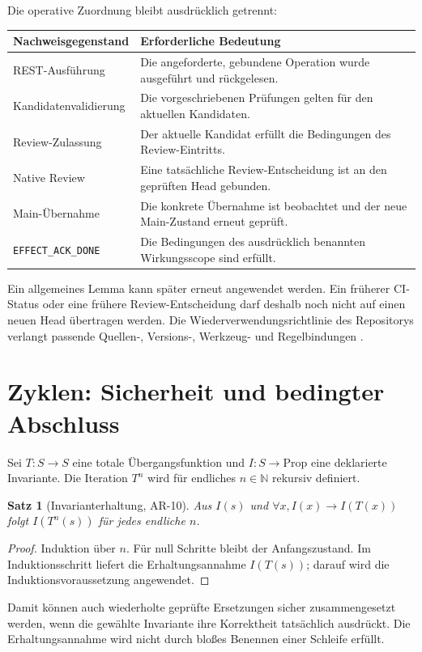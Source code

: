 \documentclass[11pt,a4paper]{article}
\newtheorem{satz}{Satz}
\newcommand{\AR}[1]{\textsf{AR-#1}}
\newcommand{\N}{\mathbb N}
\begin{document}
Die operative Zuordnung bleibt ausdrücklich getrennt:
\begin{center}\small
\begin{tabularx}{\textwidth}{@{}p{35mm}X@{}}\toprule
Nachweisgegenstand & Erforderliche Bedeutung \\\midrule
REST-Ausführung & Die angeforderte, gebundene Operation wurde ausgeführt und rückgelesen.\\
Kandidatenvalidierung & Die vorgeschriebenen Prüfungen gelten für den aktuellen Kandidaten.\\
Review-Zulassung & Der aktuelle Kandidat erfüllt die Bedingungen des Review-Eintritts.\\
Native Review & Eine tatsächliche Review-Entscheidung ist an den geprüften Head gebunden.\\
Main-Übernahme & Die konkrete Übernahme ist beobachtet und der neue Main-Zustand erneut geprüft.\\
\texttt{EFFECT\_ACK\_DONE} & Die Bedingungen des ausdrücklich benannten Wirkungsscope sind erfüllt.\\\bottomrule
\end{tabularx}\end{center}
Ein allgemeines Lemma kann später erneut angewendet werden. Ein früherer
CI-Status oder eine frühere Review-Entscheidung darf deshalb noch nicht auf einen
neuen Head übertragen werden. Die Wiederverwendungsrichtlinie des Repositorys
verlangt passende Quellen-, Versions-, Werkzeug- und Regelbindungen \cite{qikpolicy}.

\section{Zyklen: Sicherheit und bedingter Abschluss}
Sei $T:S\to S$ eine totale Übergangsfunktion und $I:S\to\mathrm{Prop}$ eine
deklarierte Invariante. Die Iteration $T^n$ wird für endliches $n\in\N$ rekursiv
definiert.
\begin{satz}[Invarianterhaltung, \AR{10}]
Aus $I(s)$ und $\forall x, I(x)\to I(T(x))$ folgt $I(T^n(s))$ für jedes endliche $n$.
\end{satz}
\begin{proof}
Induktion über $n$. Für null Schritte bleibt der Anfangszustand. Im
Induktionsschritt liefert die Erhaltungsannahme $I(T(s))$; darauf wird die
Induktionsvoraussetzung angewendet.
\end{proof}
Damit können auch wiederholte geprüfte Ersetzungen sicher zusammengesetzt werden,
wenn die gewählte Invariante ihre Korrektheit tatsächlich ausdrückt. Die
Erhaltungsannahme wird nicht durch bloßes Benennen einer Schleife erfüllt.
\end{document}
